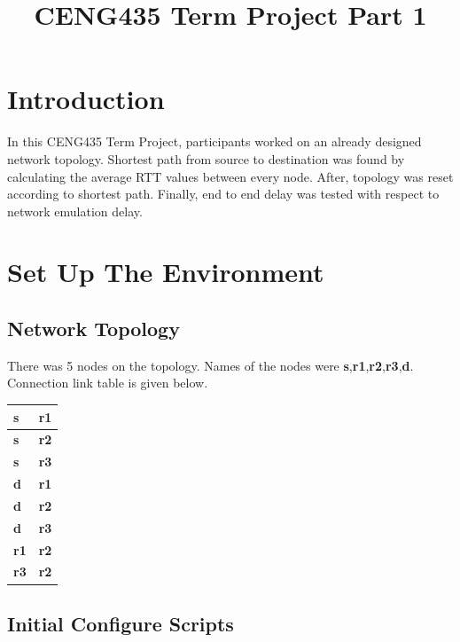 \documentclass[conference]{IEEEtran}
\begin{document}
\title{CENG435 Term Project Part 1
}

\author{
\and
{}
}

\maketitle

\section{Introduction}
In this CENG435 Term Project, participants worked on an already designed network topology. Shortest path from source to destination was found by calculating the average RTT values between every node. After, topology was reset according to shortest path. Finally, end to end delay was tested with respect to network emulation delay.

\section{Set Up The Environment}
\subsection{Network Topology}
There was 5 nodes on the topology. Names of the nodes were \textbf{s},\textbf{r1},\textbf{r2},\textbf{r3},\textbf{d}.
Connection link table is given below.
\begin{table}[h]
\centering
\begin{tabular}{|l|l|}
\hline
\textbf{s}  & \textbf{r1} \\ \hline
\textbf{s}  & \textbf{r2} \\ \hline
\textbf{s}  & \textbf{r3} \\ \hline
\textbf{d}  & \textbf{r1} \\ \hline
\textbf{d}  & \textbf{r2} \\ \hline
\textbf{d}  & \textbf{r3} \\ \hline
\textbf{r1} & \textbf{r2} \\ \hline
\textbf{r3} & \textbf{r2} \\ \hline
\end{tabular}
\end{table}

\subsection{Initial Configure Scripts}
\end{document}
